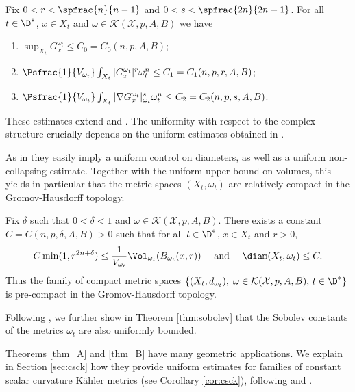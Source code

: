 \begin{thmA}\label{thm_A}
Fix $0<r<\spfrac{n}{n-1}$ and $0<s< \spfrac{2n}{2n-1}$.
For all $t \in \D^*$, $x \in X_t$ and $\omega \in {\mathcal K}(\mathcal{X},p,A,B)$ we have
\begin{enumerate}
\item $\sup_{X_t} G_x^{\omega_t} \leq C_0=C_0(n,p,A,B)$;

\item $\Psfrac{1}{V_{\omega_t}} \int_{X_t} |G_x^{\omega_t}|^r \omega_t^n \leq C_1=C_1(n,p,r,A,B)$;

\item $\Psfrac{1}{V_{\omega_t}} \int_{X_t} |\nabla G_x^{\omega_t}|_{\omega_t}^s \omega_t^n \leq C_2=C_2(n,p,s,A,B)$.
\end{enumerate}
\end{thmA}

These estimates extend \cite[Th.\,1 \& Th.\,2]{GPS22} and \cite[Th.\,1.1]{GPSS22}.
The uniformity with respect to the complex structure crucially depends on the uniform estimates
obtained in \cite{DnGG23}.

As in \cite{GPSS22} they easily imply a uniform control on diameters, as well
as a uniform non-collapsing estimate. Together with the uniform upper bound on volumes, this yields
in particular that the metric spaces $(X_t,\omega_t)$ are relatively compact in the Gromov-Hausdorff topology.

\begin{thmA}\label{thm_B}
Fix $\delta$ such that $0<\delta<1$ and $\omega \in {\mathcal K}(\mathcal{X},p,A,B)$.
There exists a constant $C=C(n,p,\delta,A,B)>0$ such that for all $ t\in \D^*$, $x \in X_t$ and $r>0$,\vspace*{-3pt}
\[
C \min(1,r^{2n+\delta}) \leq \frac{1}{V_{\omega_t}} \Vol_{\omega_t}(B_{\omega_t}(x,r))
\quad \text{ and } \quad
\diam(X_t,\omega_t) \leq C.
\]
Thus the family of compact metric spaces
$\{ (X_t,d_{\omega_t}), \; \omega \in {\mathcal K}(\mathcal{X},p,A,B), \, t \in \D^* \}$
is pre-compact in the Gromov-Hausdorff topology.
\end{thmA}

Following \cite{GPSS23}, we further show in Theorem \ref{thm:sobolev}
that the Sobolev constants of the metrics $\omega_t$ are also uniformly bounded.

Theorems \ref{thm_A} and \ref{thm_B} have many geometric applications. We
explain in Section \ref{sec:csck} how they provide uniform estimates
for families of constant scalar curvature Kähler metrics (see Corollary \ref{cor:csck}), following
\cite{CC21} and \cite{PTT23}.

